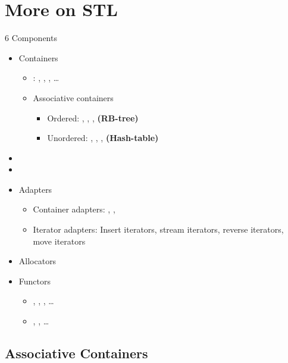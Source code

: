 \section{More on STL}

\begin{frame}{6 Components}
    \begin{itemize}
        \item Containers
        \begin{itemize}
            \item {}: , , , \dots
            \item Associative containers
            \begin{itemize}
                \item Ordered: , , ,  \textbf{(RB-tree)}
                \item Unordered: , , ,  \textbf{(Hash-table)}
            \end{itemize}
        \end{itemize}
        \item {}
        \item {}
        \item Adapters
        \begin{itemize}
            \item Container adapters: , , 
            \item Iterator adapters: Insert iterators, stream iterators, reverse iterators, move iterators
        \end{itemize}
        \item Allocators
        \item Functors
        \begin{itemize}
            \item {}, , , \dots
            \item {}, , \dots
        \end{itemize}
    \end{itemize}
\end{frame}

\subsection{Associative Containers}

